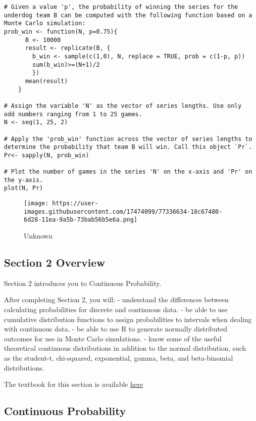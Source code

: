 \documentclass[
]{article}
\begin{document}
\begin{verbatim}
# Given a value 'p', the probability of winning the series for the underdog team B can be computed with the following function based on a Monte Carlo simulation:
prob_win <- function(N, p=0.75){
      B <- 10000
      result <- replicate(B, {
        b_win <- sample(c(1,0), N, replace = TRUE, prob = c(1-p, p))
        sum(b_win)>=(N+1)/2
        })
      mean(result)
    }

# Assign the variable 'N' as the vector of series lengths. Use only odd numbers ranging from 1 to 25 games.
N <- seq(1, 25, 2)

# Apply the 'prob_win' function across the vector of series lengths to determine the probability that team B will win. Call this object `Pr`.
Pr<- sapply(N, prob_win)

# Plot the number of games in the series 'N' on the x-axis and 'Pr' on the y-axis.
plot(N, Pr)
\end{verbatim}

\begin{figure}
\centering
\texttt{[image: https://user-images.githubusercontent.com/17474099/77336634-18c67480-6d28-11ea-9a5b-73bab56b5e6a.png]}
\caption{Unknown}
\end{figure}

\hypertarget{section-2-overview}{%
\subsection{Section 2 Overview}\label{section-2-overview}}

Section 2 introduces you to Continuous Probability.

After completing Section 2, you will: - understand the differences
between calculating probabilities for discrete and continuous data. - be
able to use cumulative distribution functions to assign probabilities to
intervals when dealing with continuous data. - be able to use R to
generate normally distributed outcomes for use in Monte Carlo
simulations. - know some of the useful theoretical continuous
distributions in addition to the normal distribution, such as the
student-t, chi-squared, exponential, gamma, beta, and beta-binomial
distributions.

The textbook for this section is available
\href{https://rafalab.github.io/dsbook/probability.html\#continuous-probability}{here}

\hypertarget{continuous-probability}{%
\subsection{Continuous Probability}\label{continuous-probability}}
\end{document}
